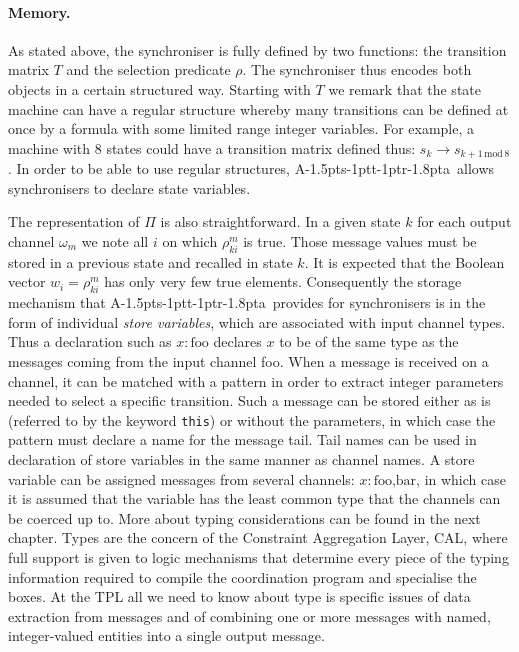 \documentclass[11pt]{report}
\def\ak{{\textsf{A\kern-1.5pts\kern-1ptt\kern-1ptr\kern-1.8pta}}\kern-2pt{\it K\kern-2ptahn}}
\begin{document}
\paragraph{Memory.}As stated above, the synchroniser is fully defined by two functions: the transition matrix $T$ and the selection predicate $\rho$. The synchroniser thus encodes both objects in a certain structured way. Starting with $T$ we remark that the state machine can have a regular structure whereby many
transitions can be defined at once by a formula with some limited range integer variables. For example,
a machine with 8 states could have a transition matrix defined thus: $s_k \to s_{k+1\,\mbox{mod}\,8}$. In order to be able to use regular structures, \ak\ allows synchronisers to declare state variables.

The representation of $\Pi$ is also straightforward. In a given state $k$ for each output channel $\omega_m$
we note all $i$ on which $\rho_{ki}^m$ is true. Those message values must be stored in a previous state
and recalled in state $k$. It is expected that the Boolean vector $w_i=\rho_{ki}^m$ has only very few
true elements. Consequently the storage mechanism that \ak\ provides for synchronisers is in the form
of individual {\em store variables}, which are associated with input channel types. Thus a declaration
such as $x:\mbox{foo}$ declares $x$ to be of the same type as the messages coming from the input
channel foo. When a message is received on a channel, it can be matched with a pattern in order to extract integer parameters needed to select a specific transition. Such a message can be stored either as is (referred to by the keyword {\tt this}) or without the parameters, in which case the pattern must declare a name for the message tail. Tail names can be used in declaration of store variables in the same manner as channel names.
A store variable can be assigned messages from several channels: $x:\mbox{foo,bar}$,
in which case it is assumed that the variable has the least common type that the channels can be
coerced up to. More about typing considerations can be found in the next chapter. Types are the concern of the Constraint Aggregation Layer, CAL, where full support is given to logic mechanisms
that determine every piece of the typing information required to compile the coordination program and specialise the boxes. At the TPL all we need to know about type is specific issues of data extraction from
messages and of combining one or more messages with named, integer-valued entities into a single output message.
\end{document}
